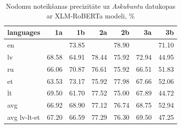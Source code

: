 \begin{table}[htbp]
  \centering
  \caption{Nodomu noteikšanas precizitāte uz \textit{Askubuntu} datukopas ar XLM-RoBERTa modeli, \%}
    \begin{tabular}{lrrrrrr}\toprule
    languages & 1a & 1b & 2a & 2b & 3a & 3b \\\midrule
    en    &       & \cellcolor[rgb]{ .694,  .784,  .898}73.85 &       & \cellcolor[rgb]{ .353,  .541,  .776}78.90 &       & \cellcolor[rgb]{ .882,  .914,  .965}71.10 \\
    lv    & \cellcolor[rgb]{ .984,  .965,  .976}68.58 & \cellcolor[rgb]{ .984,  .878,  .89}64.91 & \cellcolor[rgb]{ .384,  .565,  .788}78.44 & \cellcolor[rgb]{ .557,  .686,  .851}75.92 & \cellcolor[rgb]{ .757,  .827,  .922}72.94 & \cellcolor[rgb]{ .973,  .416,  .424}44.95 \\
    ru    & \cellcolor[rgb]{ .984,  .906,  .918}66.06 & \cellcolor[rgb]{ .898,  .925,  .969}70.87 & \cellcolor[rgb]{ .51,  .651,  .831}76.61 & \cellcolor[rgb]{ .557,  .686,  .851}75.92 & \cellcolor[rgb]{ .984,  .918,  .929}66.51 & \cellcolor[rgb]{ .976,  .576,  .584}51.83 \\
    et    & \cellcolor[rgb]{ .984,  .847,  .859}63.53 & \cellcolor[rgb]{ .741,  .816,  .914}73.17 & \cellcolor[rgb]{ .557,  .686,  .851}75.92 & \cellcolor[rgb]{ .416,  .588,  .8}77.98 & \cellcolor[rgb]{ .984,  .945,  .957}67.66 & \cellcolor[rgb]{ .976,  .58,  .588}52.06 \\
    lt    & \cellcolor[rgb]{ .988,  .988,  1}69.50 & \cellcolor[rgb]{ .98,  .804,  .816}61.70 & \cellcolor[rgb]{ .447,  .608,  .812}77.52 & \cellcolor[rgb]{ .62,  .729,  .871}75.00 & \cellcolor[rgb]{ .984,  .949,  .961}67.89 & \cellcolor[rgb]{ .973,  .412,  .42}44.72 \\\midrule
    avg   & \cellcolor[rgb]{ .984,  .925,  .937}66.92 & \cellcolor[rgb]{ .984,  .973,  .984}68.90 & \cellcolor[rgb]{ .475,  .627,  .82}77.12 & \cellcolor[rgb]{ .502,  .647,  .831}76.74 & \cellcolor[rgb]{ .984,  .969,  .98}68.75 & \cellcolor[rgb]{ .976,  .6,  .612}52.94 \\
    avg lv-lt-et & \cellcolor[rgb]{ .984,  .933,  .945}67.20 & \cellcolor[rgb]{ .984,  .918,  .929}66.59 & \cellcolor[rgb]{ .463,  .62,  .816}77.29 & \cellcolor[rgb]{ .529,  .667,  .839}76.30 & \cellcolor[rgb]{ .988,  .988,  1}69.50 & \cellcolor[rgb]{ .973,  .467,  .478}47.25 \\\bottomrule
    \end{tabular}%
  \label{tab:askubuntu-xlm}%
\end{table}%



